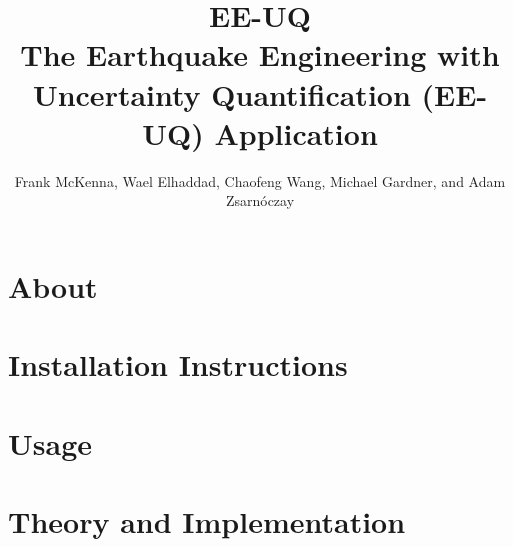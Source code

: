 \documentclass{simcenterdocumentation}
\begin{document}
\title{EE-UQ\\ \Large The Earthquake Engineering with Uncertainty Quantification (EE-UQ) Application}
\author{Frank McKenna, Wael Elhaddad, Chaofeng Wang, Michael Gardner, and Adam Zsarn\'oczay}

\hypersetup{pageanchor=false}
\maketitle
\copyrightpage
\acknowledgments

\hypersetup{pageanchor=true}
\begin{frontmatter}

\pagestyle{plain}
{
  \renewcommand{\thispagestyle}[1]{}
  \tableofcontents
  \clearpage
  \listoffigures
  \clearpage
  \listoftables
}

\end{frontmatter}
\pagestyle{somewhatsimple}

\chapter{About}
\label{chap:about}


\chapter{Installation Instructions}
\label{chap:installation}


\chapter{Usage}
\label{chap:usage}


\chapter{Theory and Implementation}
\label{chap:theory}

\end{document}
